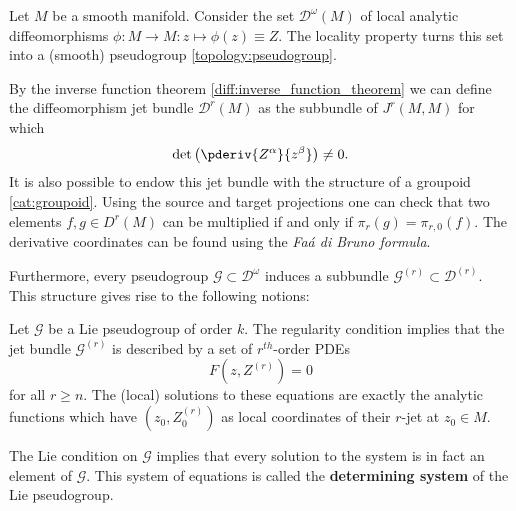     \begin{example}
        Let $M$ be a smooth manifold. Consider the set $\mathcal{D}^\omega(M)$ of local analytic diffeomorphisms $\phi:M\rightarrow M:z\mapsto\phi(z)\equiv Z$. The locality property turns this set into a (smooth) pseudogroup \ref{topology:pseudogroup}.

        By the inverse function theorem \ref{diff:inverse_function_theorem} we can define the diffeomorphism jet bundle $\mathcal{D}^r(M)$ as the subbundle of $J^r(M, M)$ for which \[\det\left(\pderiv{Z^\alpha}{z^\beta}\right)\neq0.\] It is also possible to endow this jet bundle with the structure of a groupoid \ref{cat:groupoid}. Using the source and target projections one can check that two elements $f,g\in D^r(M)$ can be multiplied if and only if $\pi_r(g) = \pi_{r,0}(f)$. The derivative coordinates can be found using the \textit{Fa\'a di Bruno formula}.

        Furthermore, every pseudogroup $\mathcal{G}\subset\mathcal{D}^\omega$ induces a subbundle $\mathcal{G}^{(r)}\subset\mathcal{D}^{(r)}$. This structure gives rise to the following notions:
    \end{example}
    \begin{property}
        Let $\mathcal{G}$ be a Lie pseudogroup of order $k$. The regularity condition implies that the jet bundle $\mathcal{G}^{(r)}$ is described by a set of $r^{th}$-order PDEs \[F\left(z, Z^{(r)}\right) = 0\] for all $r\geq n$. The (local) solutions to these equations are exactly the analytic functions which have $(z_0, Z^{(r)}_0)$ as local coordinates of their $r$-jet at $z_0\in M$.

        The Lie condition on $\mathcal{G}$ implies that every solution to the system is in fact an element of $\mathcal{G}$. This system of equations is called the \textbf{determining system} of the Lie pseudogroup.
    \end{property}

